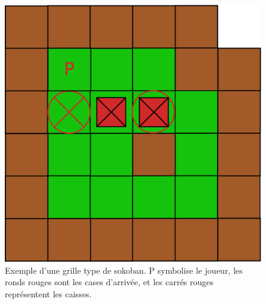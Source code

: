 \documentclass[10pt,a4paper]{article}
\begin{document}
\begin{figure}[!h]
	\centering  
	\includegraphics[scale=0.2]{Diagram1.eps}  
	\caption{
			Exemple d'une grille type de sokoban. P symbolise le joueur, les ronds rouges sont les cases d'arrivée, et les carrés rouges représentent les caisses.
	}
	\label{label-figure1}
\end{figure}
\end{document}
